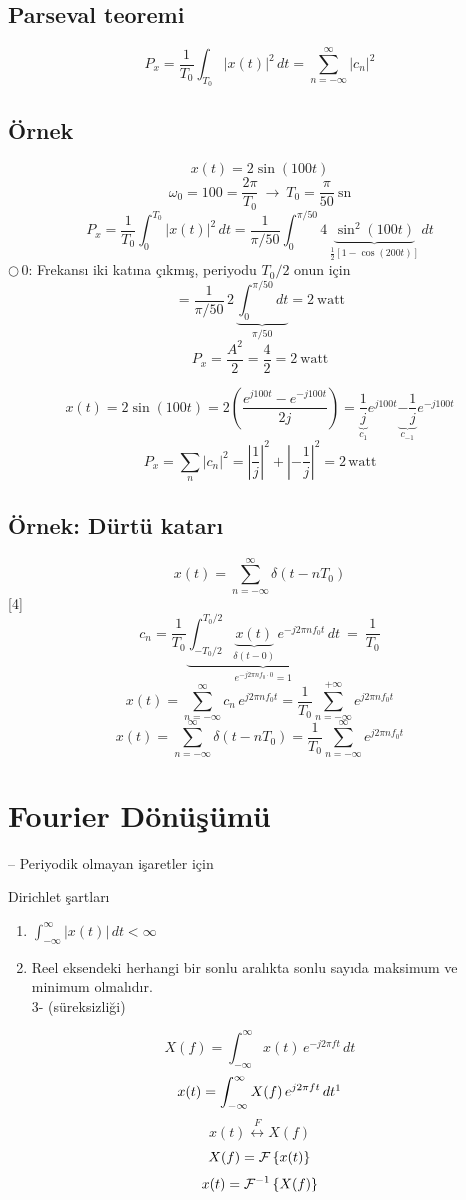 \documentclass[11pt,a4paper]{article}
\begin{document}
\subsection{Parseval teoremi}
\[ P_x=\frac{1}{T_0}\int_{T_0}|x(t)|^2\,dt=\sum_{n=-\infty}^{\infty}|c_n|^2 \]

\subsection{Örnek}
\[ x(t)=2\sin(100t) \]
\[ \omega_0=100=\frac{2\pi}{T_0}\ \rightarrow\ T_0=\frac{\pi}{50}\ \mathrm{sn} \]
\[ P_x=\frac{1}{T_0}\int_0^{T_0}|x(t)|^2\,dt=\frac{1}{\pi/50}\int_0^{\pi/50}4\,\underbrace{\sin^2(100t)}_{\frac12[1-\cos(200t)]}\,dt \]
{\small $\bigcirc$\,0: Frekansı iki katına çıkmış, periyodu $T_0/2$ onun için}
\[ =\frac{1}{\pi/50}\,2\,\underbrace{\int_0^{\pi/50}dt}_{\pi/50}=2\ \text{watt} \]
\[ P_x=\frac{A^2}{2}=\frac{4}{2}=2\ \text{watt} \]

\[ x(t)=2\sin(100t)=2\left(\frac{e^{j100t}-e^{-j100t}}{2j}\right)=\underbrace{\frac{1}{j}}_{c_1}e^{j100t}\underbrace{-\frac{1}{j}}_{c_{-1}}e^{-j100t} \]
\[ P_x=\sum_n|c_n|^2=\left|\frac{1}{j}\right|^2+\left|-\frac{1}{j}\right|^2=2\,\text{watt} \]

\subsection{Örnek: Dürtü katarı}
\[ x(t)=\sum_{n=-\infty}^{\infty}\delta(t-nT_0) \]
[4]
\[ c_n=\frac{1}{T_0}\underbrace{\int_{-T_0/2}^{T_0/2}\underbrace{x(t)}_{\delta(t-0)}\,e^{-j2\pi n f_0 t}\,dt}_{e^{-j2\pi n f_0\cdot 0}=1}\ =\ \frac{1}{T_0} \]
\[ x(t)=\sum_{n=-\infty}^{\infty}c_n\,e^{j2\pi n f_0 t}=\frac{1}{T_0}\sum_{n=-\infty}^{+\infty}e^{j2\pi n f_0 t} \]
\[ x(t)=\sum_{n=-\infty}^{\infty}\delta(t-nT_0)=\frac{1}{T_0}\sum_{n=-\infty}^{\infty}e^{j2\pi n f_0 t} \]

\section{Fourier Dönüşümü}
-- Periyodik olmayan işaretler için

Dirichlet şartları
\begin{enumerate}[label=\arabic*)]
\item $\displaystyle\int_{-\infty}^{\infty}|x(t)|\,dt<\infty$
\item Reel eksendeki herhangi bir sonlu aralıkta sonlu sayıda maksimum ve minimum olmalıdır.\\
\textcolor{turuncukalem}{3- (süreksizliği)}
\end{enumerate}
\[ X(f)=\int_{-\infty}^{\infty}x(t)\,e^{-j2\pi ft}\,dt \]
\[ x(t)=\int_{-\infty}^{\infty}X(f)\,e^{j2\pi ft}\,dt\footnotemark \]
\[ x(t)\overset{F}{\longleftrightarrow}X(f) \]
\[ X(f)=\mathcal{F}\left\{x(t)\right\} \]
\[ x(t)=\mathcal{F}^{-1}\left\{X(f)\right\} \]
\end{document}
